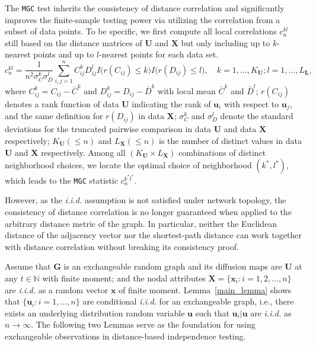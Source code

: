 \documentclass[11pt]{article}
\theoremstyle{definition}
\begin{document}
The \texttt{MGC} test inherits the consistency of distance correlation and significantly improves the finite-sample testing power via utilizing the correlation from a subset of data points. To be specific, we first compute all local correlations $c^{kl}_{n}$ still based on the distance matrices of $\mathbf{U}$ and $\mathbf{X}$ but only including up to $k$-nearest points and up to $l$-nearest points for each data set. 
\begin{equation}
\label{eq:MGC}
c^{kl}_{n} = \frac{1}{n^2 \sigma^{k}_{C} \sigma^{l}_{D}} \sum\limits_{i,j=1}^{n} C^{k}_{ij} D^{l}_{ij} I\big( r(C_{ij}) \leq k \big) I\big(  r(D_{ij}) \leq l  \big), \quad k= 1, \ldots, K_{\mathbf{U}}; l =1, \ldots, L_{\mathbf{L}},
\end{equation}
where $C^{k}_{ij} = C_{ij} - \bar{C}^{k}$ and $D^{k}_{ij} = D_{ij} - \bar{D}^{k}$ with local mean $\bar{C}^{k}$ and $\bar{D}^{l}$; $r(C_{ij})$ denotes a rank function of data $\mathbf{U}$ indicating the rank of $\mathbf{u}_{i}$ with respect to $\mathbf{u}_{j}$, and the same definition for $r(D_{ij})$ in data $\mathbf{X}$; $\sigma^{k}_{C}$ and $\sigma^{l}_{D}$ denote the standard deviations for the truncated pairwise comparison in data $\mathbf{U}$ and data $\mathbf{X}$ respectively; $K_{\mathbf{U}} (\leq n)$ and $L_{\mathbf{X}} (\leq n)$ is the number of distinct values in data $\mathbf{U}$ and $\mathbf{X}$ respectively. Among all $( K_{\mathbf{U}} \times L_{\mathbf{X}} )$ combinations of distinct neighborhood choices, we locate the optimal choice of neighborhood $(k^{*}, l^{*})$, which leads to the \texttt{MGC} statistic $c^{k^{*} l^{*}}_{n}$. 

However, as the \textit{i.i.d.} assumption is not satisfied under network topology, the consistency of distance correlation is no longer guaranteed when applied to the arbitrary distance metric of the graph. In particular, neither the Euclidean distance of the adjacency vector nor the shortest-path distance can work together with distance correlation without breaking its consistency proof. 

Assume that $\mathbf{G}$ is an exchangeable random graph and its diffusion maps are $\mathbf{U}$ at any $t \in \mathbb{N}$ with finite moment; and the nodal attributes $\mathbf{X}=\{ \mathbf{x}_{i}: i = 1,2, \ldots, n \}$ are \textit{i.i.d.} as a random vector $\mathbf{x}$ of finite moment. Lemma~\ref{main_lemma} shows that $\{ \mathbf{u}_{i} : i = 1, \ldots, n  \}$ are conditional \textit{i.i.d.} for an exchangeable graph, i.e., there exists an underlying distribution random variable $\mathbf{u}$ such that $\mathbf{u}_{i}|\mathbf{u}$ are \textit{i.i.d.} as $n \rightarrow \infty$. The following two Lemmas serve as the foundation for using exchangeable observations in distance-based independence testing. 
\end{document}
